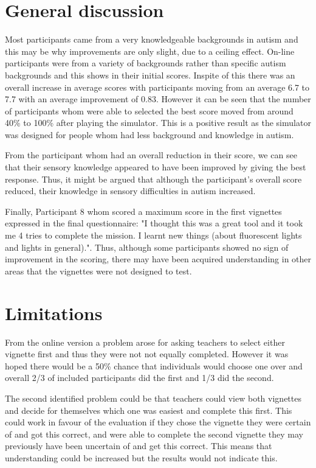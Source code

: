 \documentclass[11pt]{report}
\begin{document}
\section{General discussion}

Most participants came from a very knowledgeable backgrounds in autism and this may be why improvements are only slight, due to a ceiling effect. On-line participants were from a variety of backgrounds rather than specific autism backgrounds and this shows in their initial scores. Inspite of this there was an overall increase in average scores with participants moving from an average 6.7 to 7.7 with an average improvement of 0.83. However it can be seen that the number of participants whom were able to selected the best score moved from around 40\% to 100\% after playing the simulator. This is a positive result as the simulator was designed for people whom had less background and knowledge in autism. 

From the participant whom had an overall reduction in their score, we can see that their sensory knowledge appeared to have been improved by giving the best response. Thus, it might be argued that although the participant's overall score reduced, their knowledge in sensory difficulties in autism increased. 

Finally, Participant 8 whom scored a maximum score in the first vignettes expressed in the final questionnaire: "I thought this was a great tool and it took me 4 tries to complete the mission. I learnt new things (about fluorescent lights and lights in general).". Thus, although some participants showed no sign of improvement in the scoring, there may have been acquired understanding in other areas that the vignettes were not designed to test.


\section{Limitations}

From the online version a problem arose for asking teachers to select either vignette first and thus they were not not equally completed. However it was hoped there would be a 50\% chance that individuals would choose one over and overall 2/3 of included participants did the first and 1/3 did the second.

The second identified problem could be that teachers could view both vignettes and decide for themselves which one was easiest and complete this first. This could work in favour of the evaluation if they chose the vignette they were certain of and got this correct, and were able to complete the second vignette they may previously have been uncertain of and get this correct. This means that understanding could be increased but the results would not indicate this. 
\end{document}
